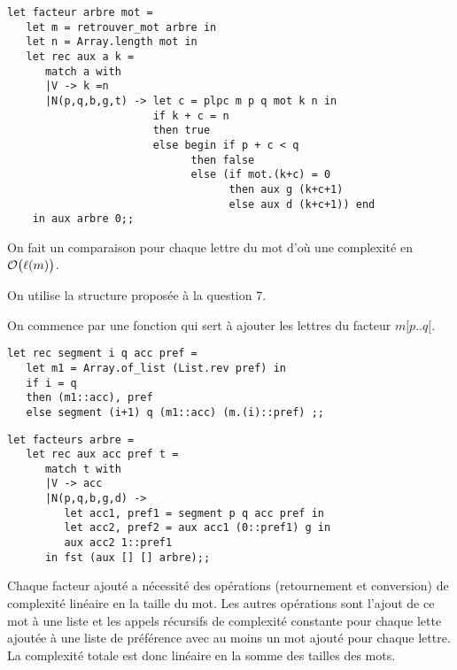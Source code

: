\begin{Exercise}
\begin{lstlisting}
let facteur arbre mot =
   let m = retrouver_mot arbre in
   let n = Array.length mot in
   let rec aux a k =
      match a with
      |V -> k =n
      |N(p,q,b,g,t) -> let c = plpc m p q mot k n in
                       if k + c = n
                       then true
                       else begin if p + c < q
                             then false
                             else (if mot.(k+c) = 0
                                   then aux g (k+c+1)
                                   else aux d (k+c+1)) end
    in aux arbre 0;;                         
\end{lstlisting}
On fait un comparaison pour chaque lettre du mot d'où une complexité en ${\cal O}\bigl(\ell(m)\bigr)$.
\end{Exercise} 
\begin{Exercise}On utilise la structure proposée à la question 7.

On commence par une fonction qui sert à ajouter les lettres du facteur $m[p..q[$.
\begin{lstlisting}
let rec segment i q acc pref = 
   let m1 = Array.of_list (List.rev pref) in
   if i = q 
   then (m1::acc), pref
   else segment (i+1) q (m1::acc) (m.(i)::pref) ;;
\end{lstlisting}


\begin{lstlisting}
let facteurs arbre = 
   let rec aux acc pref t =
      match t with
      |V -> acc
      |N(p,q,b,g,d) -> 
         let acc1, pref1 = segment p q acc pref in
         let acc2, pref2 = aux acc1 (0::pref1) g in
         aux acc2 1::pref1
      in fst (aux [] [] arbre);;
\end{lstlisting}
Chaque facteur ajouté a nécessité des opérations (retournement et conversion) de complexité linéaire en la taille du mot. Les autres opérations sont l'ajout de ce mot à une liste et les appels récursifs de complexité constante pour chaque lette ajoutée à une liste de préférence avec au moins un mot ajouté pour chaque lettre. La complexité totale est donc linéaire en la somme des tailles des mots.
\end{Exercise} 
